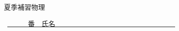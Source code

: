 \documentclass[a4paper,9pt]{jsarticle}
\begin{document}
\hakosyokika
\begin{center}
{\Large 夏季補習物理}
\end{center}
\hfill ~\underline{~~~~~~番　氏名~~~~~~~~~~~~~~~~~~~~~~~~~~~~~~~~~~~}
\hakosyokika

\begin{enumerate}
    
\newpage
    
\newpage
    
\newpage
    
\newpage
    
\newpage
    
\newpage
    
\newpage
    
\newpage
    
\newpage
    
\newpage
    
\newpage
    
\newpage
    
\newpage
    
\newpage
    
\newpage
    
\newpage
    
\newpage
    
\newpage
    
\newpage
    
\newpage
    
\newpage
    
\newpage
    
\newpage
    
\newpage
    
\newpage
    
\newpage
    
\newpage
    
\newpage
    
\vfill
\end{enumerate}
\end{document}
